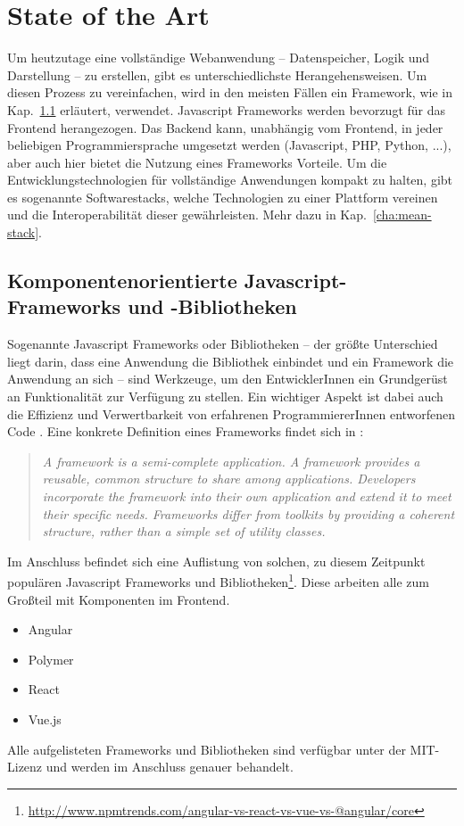 \chapter{State of the Art}
\label{cha:StateOfTheArt}
Um heutzutage eine vollständige Webanwendung -- Datenspeicher, Logik und Darstellung -- zu erstellen, gibt es unterschiedlichste Herangehensweisen. Um diesen Prozess zu vereinfachen, wird in den meisten Fällen ein Framework, wie in Kap.~\ref{cha:javascript-frameworks} erläutert, verwendet. Javascript Frameworks werden bevorzugt für das Frontend herangezogen. Das Backend kann, unabhängig vom Frontend, in jeder beliebigen Programmiersprache umgesetzt werden (Javascript, PHP, Python, ...), aber auch hier bietet die Nutzung eines Frameworks Vorteile. Um die Entwicklungstechnologien für vollständige Anwendungen kompakt zu halten, gibt es sogenannte Softwarestacks, welche Technologien zu einer Plattform vereinen und die Interoperabilität dieser gewährleisten. Mehr dazu in Kap.~\ref{cha:mean-stack}.

\section{Komponentenorientierte Javascript-Frameworks und -Bibliotheken}
\label{cha:javascript-frameworks}
Sogenannte Javascript Frameworks oder Bibliotheken -- der größte Unterschied liegt darin, dass eine Anwendung die Bibliothek einbindet und ein Framework die Anwendung an sich -- sind Werkzeuge, um den EntwicklerInnen ein Grundgerüst an Funktionalität zur Verfügung zu stellen. Ein wichtiger Aspekt ist dabei auch die Effizienz und Verwertbarkeit von erfahrenen ProgrammiererInnen entworfenen Code \cite{js-frameworks}.
Eine konkrete Definition eines Frameworks findet sich in \cite{def-framework}: 
\begin{quote}\textit{A framework is a semi-complete application. A framework provides a reusable, common structure to share among applications. Developers incorporate the framework into their own application and extend it to meet their specific needs. Frameworks differ from toolkits by providing a coherent structure, rather than a simple set of utility classes.}
\end{quote}

Im Anschluss befindet sich eine Auflistung von solchen, zu diesem Zeitpunkt populären Javascript Frameworks und Bibliotheken\footnote{\url{http://www.npmtrends.com/angular-vs-react-vs-vue-vs-@angular/core}}. Diese arbeiten alle zum Großteil mit Komponenten im Frontend.
\begin{itemize}  
	\item Angular
	\item Polymer
	\item React
	\item Vue.js
\end{itemize}
Alle aufgelisteten Frameworks und Bibliotheken sind verfügbar unter der MIT-Lizenz und werden im Anschluss genauer behandelt.

